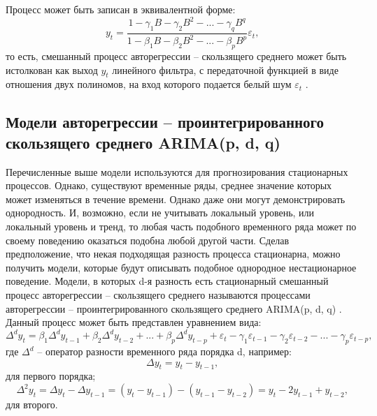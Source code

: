 \documentclass[a4paper,14pt,russian]{extreport}
\begin{document}
Процесс  может быть записан в эквивалентной форме:
\begin{equation}
	y_t = \frac
		{1 - \gamma_1 B - \gamma_2 B^2 - ... - \gamma_q B^q}
		{1 - \beta_1 B - \beta_2 B^2 - ... - \beta_p B^p}  \varepsilon_t \text{,} 
\end{equation}
то есть, смешанный процесс авторегрессии -- скользящего среднего 
может быть истолкован как выход $y_t$ линейного фильтра, с передаточной 
функцией в виде отношения двух полиномов, на вход которого подается белый 
шум $\varepsilon_t$ \cite{box2008}. 
 
 \subsection{Модели авторегрессии -- проинтегрированного скользящего среднего 
 ARIMA(p, d, q)}
 Перечисленные выше модели используются для прогнозирования стационарных 
 процессов. Однако, существуют временные ряды, среднее значение которых 
 может изменяться в течение времени. Однако даже они могут демонстрировать 
 однородность. И, возможно, если не учитывать локальный уровень, или 
 локальный уровень и тренд, то любая часть подобного временного ряда может 
 по своему поведению оказаться подобна любой другой части. Сделав 
 предположение, что некая подходящая разность процесса стационарна, можно 
 получить модели, которые будут описывать подобное однородное 
 нестационарное поведение. Модели, в которых d-я разность есть стационарный 
 смешанный процесс авторегрессии -- скользящего среднего называются 
 процессами авторегрессии -- проинтегрированного скользящего среднего 
 ARIMA(p, d, q) \cite{box2008}. Данный процесс может быть представлен 
 уравнением вида:
 \begin{equation}
	\Delta^d y_t = \beta_1 \Delta^d y_{t-1} + \beta_2 \Delta^d y_{t-2} + ... 
		+ \beta_p \Delta^d y_{t-p} + \varepsilon_t  - \gamma_1 \varepsilon_{t-1} 
		- \gamma_2 \varepsilon_{t-2} - ... - \gamma_p \varepsilon_{t-p}, 
\end{equation}
где $\Delta^d$ --  оператор разности временного ряда порядка d, например: 
\begin{equation}
	\Delta y_t = y_t - y_{t - 1} \text{,} \nonumber
\end{equation}
для первого порядка;
\begin{equation}
	\Delta^2 y_t = \Delta y_t - \Delta y_{t - 1} = (y_t - y_{t - 1}) - (y_{t - 1} - y_{t - 2}) 
		= y_t - 2y_{t - 1} + y_{t - 2} \text{,} \nonumber
\end{equation}
для второго.
\end{document}
